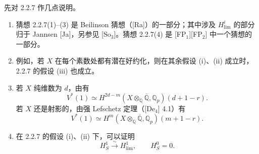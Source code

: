 先对 2.2.7 作几点说明。
\begin{enumerate}[label=(\arabic*)]
\item 猜想 2.2.7(1)--(3) 是 Beilinson 猜想（[Ra]）的一部分；其中涉及 $H^i_{\mathrm{lim}}$ 的部分归于 Jannsen [Ja]，另参见 [So$_3$]。猜想 2.2.7(4) 是 [FP$_1$][FP$_2$] 中一个猜想的一部分。
\item 例如，若 $X$ 在每个素数处都有潜在好约化，则在其余假设 (i)、(ii) 成立时，2.2.7 的假设 (iii) 也成立。
\item 若 $X$ 纯维数为 $d$，由有
\[
 V^*(1)\simeq H^{2d-m}(X\otimes_{\mathbb Q}\overline{\mathbb Q},\mathbb Q_p)(d+1-r).
\]
若 $X$ 还是射影的，由强 Lefschetz 定理（[De$_4$] 4.1）有
\[
 V^*(1)\simeq H^m(X\otimes_{\mathbb Q}\overline{\mathbb Q},\mathbb Q_p)(m+1-r).
\]
\item 在 2.2.7 的假设 (i)、(ii) 下，可以证明
\[
 H^1_S\xrightarrow{\sim}H^1_{\mathrm{lim}},\qquad H^0_S=0.
\]
\end{enumerate}

